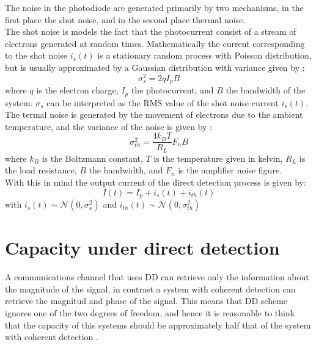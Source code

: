 The noise in the photodiode are generated primarily by two mechanisms, in the first place the shot noise, and in the second place thermal noise.\\

The shot noise is models the fact that the photocurrent consist of a stream of electrons generated at random times. Mathematically the current corresponding to the shot noise $i_s(t)$ is a stationary random process with Poisson distribution, but is usually approximated by a Gaussian distribution with variance given by \cite{Agrawal_ch4}:
\begin{equation}
\sigma_s^2 = 2qI_pB
\label{eq:shot_noise_varaince}
\end{equation}
where $q$ is the electron charge, $I_p$ the photocurrent, and $B$ the bandwidth of the system. $\sigma_s$ can be interpreted as the RMS value of the shot noise current $i_s(t)$.\\ 

The termal noise is generated by the movement  of electrons due to the ambient temperature, and the variance of the noise is given by \cite{Agrawal_ch4}:
\begin{equation}
\sigma_{th}^2 = \frac{4k_BT}{R_L} F_nB
\label{eq:thermal_noise_variance}
\end{equation}
where $k_B$ is the Boltzmann constant, $T$ is the temperature given in kelvin, $R_L$ is the load resistance, $B$ the bandwidth, and $F_n$ is the amplifier noise figure. \\

With this in mind the output current of the direct detection process is given by:
\begin{equation}
I(t) = I_p+i_s(t)+i_{th}(t)
\label{eq:DD_current}
\end{equation}
with $i_s(t)\sim\mathcal{N}(0,\sigma_s^2)$ and $i_{th}(t)\sim\mathcal{N}(0,\sigma_{th}^2)$


\section{Capacity under direct detection}
\label{sec:capacity_under_direct_detection}

A communications channel that uses DD can retrieve only the information about the magnitude of the signal, in contrast a system with coherent detection can retrieve the magnitud and phase of the signal. This means that DD scheme ignores one of the two degrees of freedom, and hence it is reasonable to think that the capacity of this systems should be approximately half that of the system with coherent detection \cite{Mecozzi_2018, Tasbihi_Tukey, Tasbihi_Capacity}.\\

